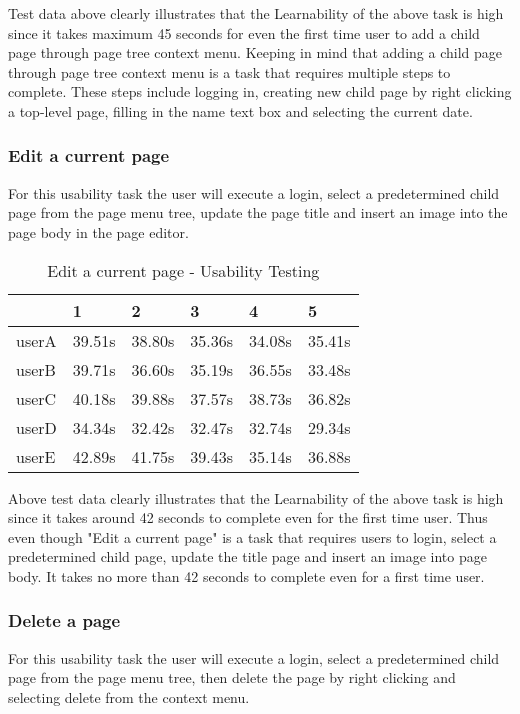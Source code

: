 \documentclass[12pt]{article}
\begin{document}
Test data above clearly illustrates that the Learnability of the above task is high since it takes maximum 45 seconds for even the first time user to add a child page through page tree context menu. Keeping in mind that adding a child page through page tree context menu is a task that requires multiple steps to complete. These steps include logging in, creating new child page by right clicking a top-level page, filling in the name text box and selecting the current date.

  
  
  
\subsubsection{Edit a current page}
For this usability task the user will execute a login, select a predetermined child page from the page menu tree, update the page title and insert an image into the page body in the page editor.

\begin{table}[H]
\centering
\caption{Edit a current page - Usability Testing}
\begin{tabular}{|l|l|l|l|l|l|}
\hline
      & 1      & 2      & 3      & 4      & 5      \\ \hline
userA & 39.51s & 38.80s & 35.36s & 34.08s & 35.41s \\ \hline
userB & 39.71s & 36.60s & 35.19s & 36.55s & 33.48s \\ \hline
userC & 40.18s & 39.88s & 37.57s & 38.73s & 36.82s \\ \hline
userD & 34.34s & 32.42s & 32.47s & 32.74s & 29.34s \\ \hline
userE & 42.89s & 41.75s & 39.43s & 35.14s & 36.88s \\ \hline
\end{tabular}
\end{table}

Above test data clearly illustrates that the Learnability of the above task is high since it takes around 42 seconds to complete even for the first time user. Thus even though "Edit a current page" is a task that requires users to login, select a predetermined child page, update the title page and insert an image into page body. It takes no more than 42 seconds to complete even for a first time user.


\subsubsection{Delete a page}
For this usability task the user will execute a login, select a predetermined child page from the page menu tree, then delete the page by right clicking and selecting delete from the context menu.
\end{document}

